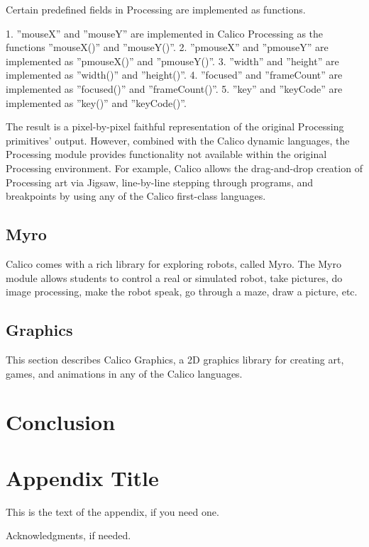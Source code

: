 \documentclass[preprint]{sigplanconf}
\begin{document}
Certain predefined fields in Processing are implemented as functions.


1. ''mouseX'' and ''mouseY'' are implemented in Calico Processing as the functions ''mouseX()'' and ''mouseY()''.
2. ''pmouseX'' and ''pmouseY'' are implemented as ''pmouseX()'' and ''pmouseY()''.
3. ''width'' and ''height'' are implemented as ''width()'' and ''height()''.
4. ''focused'' and ''frameCount'' are implemented as ''focused()'' and ''frameCount()''.
5. ''key'' and ''keyCode'' are implemented as ''key()'' and ''keyCode()''.


The result is a pixel-by-pixel faithful representation of the original Processing primitives' output. However, combined with the Calico dynamic languages, the Processing module provides functionality not available within the original Processing environment. For example, Calico allows the drag-and-drop creation of Processing art via Jigsaw, line-by-line stepping through programs, and breakpoints by using any of the Calico first-class languages.


\subsection{Myro}


Calico comes with a rich library for exploring robots, called Myro. The Myro module allows students to control a real or simulated robot, take pictures, do image processing, make the robot speak, go through a maze, draw a picture, etc. 


\subsection{Graphics}


This section describes Calico Graphics, a 2D graphics library for creating art, games, and animations in any of the Calico languages.


\section{Conclusion}


\appendix
\section{Appendix Title}


This is the text of the appendix, if you need one.


\acks


Acknowledgments, if needed.
\end{document}
